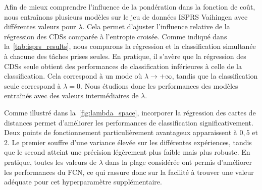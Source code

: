 Afin de mieux comprendre l'influence de la pondération dans la fonction de coût, nous entraînons plusieurs modèles sur le jeu de données \gls{ISPRS} Vaihingen avec différentes valeurs pour $\lambda$. Cela permet d'ajuster l'influence relative de la régression des \glspl{CDS} comparée à l'entropie croisée. Comme indiqué dans la~\cref{tab:isprs_results}, nous comparons la régression et la classification simultanée à chacune des tâches prises seules. En pratique, il s'avère que la régression des \glspl{CDS} seule obtient des performances de classification inférieures à celle de la classification. Cela correspond à un mode où $\lambda \rightarrow +\infty$, tandis que la classification seule correspond à $\lambda = 0$. Nous étudions donc les performances des modèles entraînés avec des valeurs intermédiaires de $\lambda$.

Comme illustré dans la~\cref{fig:lambda_space}, incorporer la régression des cartes de distances permet d'améliorer les performances de classification significativement. Deux points de fonctionnement particulièrement avantageux apparaissent à $0,5$ et $2$. Le premier souffre d'une variance élevée sur les différentes expériences, tandis que le second atteint une précision légèrement plus faible mais plus robuste. En pratique, toutes les valeurs de $\lambda$ dans la plage considérée ont permis d'améliorer les performances du \gls{FCN}, ce qui rassure donc sur la facilité à trouver une valeur adéquate pour cet hyperparamètre supplémentaire.



